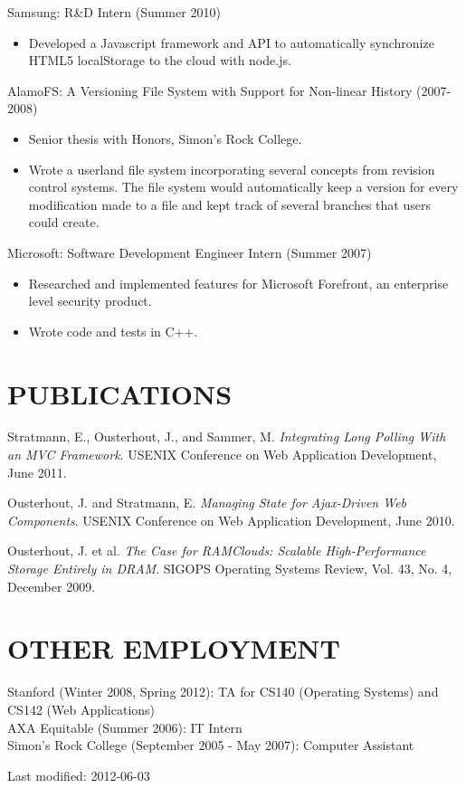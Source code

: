 \documentclass{res}
\begin{document}
\begin{resume}
Samsung: R\&D Intern (Summer 2010)
\begin{itemize}
    \item Developed a Javascript framework and API to automatically synchronize HTML5 localStorage to the cloud with node.js.
\end{itemize}

AlamoFS: A Versioning File System with Support for Non-linear History (2007-2008)
\begin{itemize}
    \item Senior thesis with Honors, Simon's Rock College.
    \item Wrote a userland file system incorporating several concepts from revision control systems. The file system would automatically keep a version for every modification made to a file and kept track of several branches that users could create.
\end{itemize}

Microsoft: Software Development Engineer Intern (Summer 2007)
\begin{itemize}
    \item Researched and implemented features for Microsoft Forefront, an enterprise level security product.
    \item Wrote code and tests in C++.
\end{itemize}

\section{PUBLICATIONS}          

Stratmann, E., Ousterhout, J., and Sammer, M. \emph{Integrating Long Polling With an MVC Framework}. USENIX Conference on Web Application Development, June 2011.

Ousterhout, J. and Stratmann, E. \emph{Managing State for Ajax-Driven Web Components}. USENIX \mbox{Conference} on Web Application Development, June 2010.

Ousterhout, J. et al. \emph{The Case for RAMClouds: Scalable High-Performance Storage Entirely in DRAM}. SIGOPS Operating Systems Review, Vol. 43, No. 4, December 2009.

\section{OTHER EMPLOYMENT}
Stanford (Winter 2008, Spring 2012): TA for CS140 (Operating Systems) and CS142 (Web Applications) \\
AXA Equitable (Summer 2006): IT Intern \\
Simon's Rock College (September 2005 - May 2007): Computer Assistant
\begin{center}\color{gray}Last modified: 2012-06-03\end{center}
\end{resume}
\end{document}
